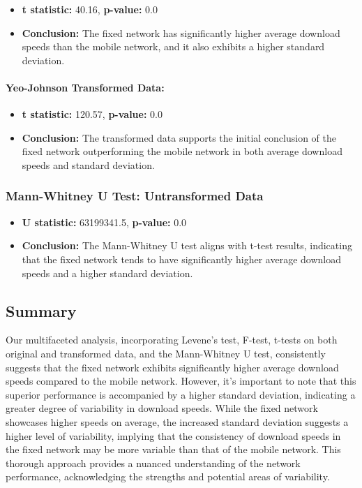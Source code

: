 \documentclass[
  letterpaper,
  DIV=11,
  numbers=noendperiod,
  oneside]{scrartcl}
\let\oldparagraph\paragraph
\renewcommand{\paragraph}[1]{\oldparagraph{#1}\mbox{}}
\providecommand{\tightlist}{%
  \setlength{\itemsep}{0pt}\setlength{\parskip}{0pt}}\usepackage{longtable,booktabs,array}
\begin{document}
\begin{itemize}
\tightlist
\item
  \textbf{t statistic:} 40.16, \textbf{p-value:} 0.0
\item
  \textbf{Conclusion:} The fixed network has significantly higher
  average download speeds than the mobile network, and it also exhibits
  a higher standard deviation.
\end{itemize}

\hypertarget{yeo-johnson-transformed-data}{%
\paragraph{Yeo-Johnson Transformed
Data:}\label{yeo-johnson-transformed-data}}

\begin{itemize}
\tightlist
\item
  \textbf{t statistic:} 120.57, \textbf{p-value:} 0.0
\item
  \textbf{Conclusion:} The transformed data supports the initial
  conclusion of the fixed network outperforming the mobile network in
  both average download speeds and standard deviation.
\end{itemize}

\hypertarget{mann-whitney-u-test-untransformed-data-1}{%
\subsubsection{Mann-Whitney U Test: Untransformed
Data}\label{mann-whitney-u-test-untransformed-data-1}}

\begin{itemize}
\tightlist
\item
  \textbf{U statistic:} 63199341.5, \textbf{p-value:} 0.0
\item
  \textbf{Conclusion:} The Mann-Whitney U test aligns with t-test
  results, indicating that the fixed network tends to have significantly
  higher average download speeds and a higher standard deviation.
\end{itemize}

\hypertarget{summary}{%
\subsection{Summary}\label{summary}}

Our multifaceted analysis, incorporating Levene's test, F-test, t-tests
on both original and transformed data, and the Mann-Whitney U test,
consistently suggests that the fixed network exhibits significantly
higher average download speeds compared to the mobile network. However,
it's important to note that this superior performance is accompanied by
a higher standard deviation, indicating a greater degree of variability
in download speeds. While the fixed network showcases higher speeds on
average, the increased standard deviation suggests a higher level of
variability, implying that the consistency of download speeds in the
fixed network may be more variable than that of the mobile network. This
thorough approach provides a nuanced understanding of the network
performance, acknowledging the strengths and potential areas of
variability.
\end{document}
